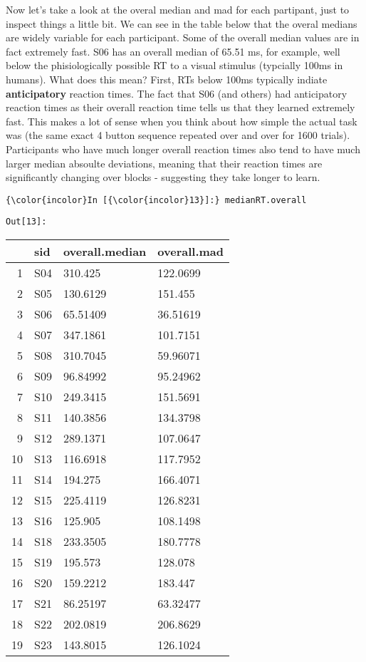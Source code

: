 \documentclass[11pt]{article}
\begin{document}
Now let's take a look at the overal median and mad for each partipant,
just to inspect things a little bit. We can see in the table below that
the overal medians are widely variable for each participant. Some of the
overall median values are in fact extremely fast. S06 has an overall
median of 65.51 ms, for example, well below the phisiologically possible
RT to a visual stimulus (typcially 100ms in humans). What does this
mean? First, RTs below 100ms typically indiate \textbf{anticipatory}
reaction times. The fact that S06 (and others) had anticipatory reaction
times as their overall reaction time tells us that they learned
extremely fast. This makes a lot of sense when you think about how
simple the actual task was (the same exact 4 button sequence repeated
over and over for 1600 trials). Participants who have much longer
overall reaction times also tend to have much larger median absoulte
deviations, meaning that their reaction times are significantly changing
over blocks - suggesting they take longer to learn.

    \begin{Verbatim}[commandchars=\\\{\}]
{\color{incolor}In [{\color{incolor}13}]:} medianRT.overall
\end{Verbatim}
\texttt{\color{outcolor}Out[{\color{outcolor}13}]:}
    
    \begin{tabular}{r|lll}
  & sid & overall.median & overall.mad\\
\hline
    1 & S04 & 310.425 & 122.0699\\
    2 & S05 & 130.6129 & 151.455\\
    3 & S06 & 65.51409 & 36.51619\\
    4 & S07 & 347.1861 & 101.7151\\
    5 & S08 & 310.7045 & 59.96071\\
    6 & S09 & 96.84992 & 95.24962\\
    7 & S10 & 249.3415 & 151.5691\\
    8 & S11 & 140.3856 & 134.3798\\
    9 & S12 & 289.1371 & 107.0647\\
    10 & S13 & 116.6918 & 117.7952\\
    11 & S14 & 194.275 & 166.4071\\
    12 & S15 & 225.4119 & 126.8231\\
    13 & S16 & 125.905 & 108.1498\\
    14 & S18 & 233.3505 & 180.7778\\
    15 & S19 & 195.573 & 128.078\\
    16 & S20 & 159.2212 & 183.447\\
    17 & S21 & 86.25197 & 63.32477\\
    18 & S22 & 202.0819 & 206.8629\\
    19 & S23 & 143.8015 & 126.1024\\
\end{tabular}
\end{document}

